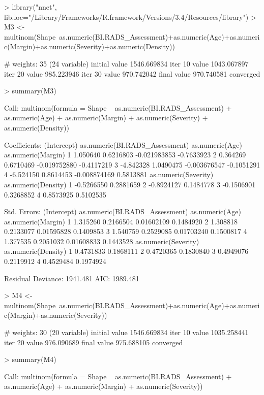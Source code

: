 \documentclass{article}
\begin{document}
\begin{Schunk}
\begin{Sinput}
> library("nnet", lib.loc="/Library/Frameworks/R.framework/Versions/3.4/Resources/library")
> M3 <- multinom(Shape~as.numeric(BI.RADS_Assessment)+as.numeric(Age)+as.numeric(Margin)+as.numeric(Severity)+as.numeric(Density))
\end{Sinput}
\begin{Soutput}
# weights:  35 (24 variable)
initial  value 1546.669834 
iter  10 value 1043.067897
iter  20 value 985.223946
iter  30 value 970.742042
final  value 970.740581 
converged
\end{Soutput}
\begin{Sinput}
> summary(M3)
\end{Sinput}
\begin{Soutput}
Call:
multinom(formula = Shape ~ as.numeric(BI.RADS_Assessment) + as.numeric(Age) + 
    as.numeric(Margin) + as.numeric(Severity) + as.numeric(Density))

Coefficients:
  (Intercept) as.numeric(BI.RADS_Assessment) as.numeric(Age) as.numeric(Margin)
1    1.050640                      0.6216803    -0.021983853         -0.7633923
2    0.364269                      0.6710469    -0.019752880         -0.4117219
3   -4.842328                      1.0490475    -0.003676547         -0.1051291
4   -6.524150                      0.8614453    -0.008874169          0.5813881
  as.numeric(Severity) as.numeric(Density)
1           -0.5266550           0.2881659
2           -0.8924127           0.1484778
3           -0.1506901           0.3268852
4            0.8573925           0.5102535

Std. Errors:
  (Intercept) as.numeric(BI.RADS_Assessment) as.numeric(Age) as.numeric(Margin)
1    1.315260                      0.2166504      0.01602109          0.1484920
2    1.308818                      0.2133077      0.01595828          0.1409853
3    1.540759                      0.2529085      0.01703240          0.1500817
4    1.377535                      0.2051032      0.01608833          0.1443528
  as.numeric(Severity) as.numeric(Density)
1            0.4731833           0.1868111
2            0.4720365           0.1830840
3            0.4949076           0.2119912
4            0.4529484           0.1974924

Residual Deviance: 1941.481 
AIC: 1989.481 
\end{Soutput}
\begin{Sinput}
> M4 <- multinom(Shape~as.numeric(BI.RADS_Assessment)+as.numeric(Age)+as.numeric(Margin)+as.numeric(Severity))
\end{Sinput}
\begin{Soutput}
# weights:  30 (20 variable)
initial  value 1546.669834 
iter  10 value 1035.258441
iter  20 value 976.090689
final  value 975.688105 
converged
\end{Soutput}
\begin{Sinput}
> summary(M4)
\end{Sinput}
\begin{Soutput}
Call:
multinom(formula = Shape ~ as.numeric(BI.RADS_Assessment) + as.numeric(Age) + 
    as.numeric(Margin) + as.numeric(Severity))


\end{Soutput}
\end{Schunk}
\end{document}
